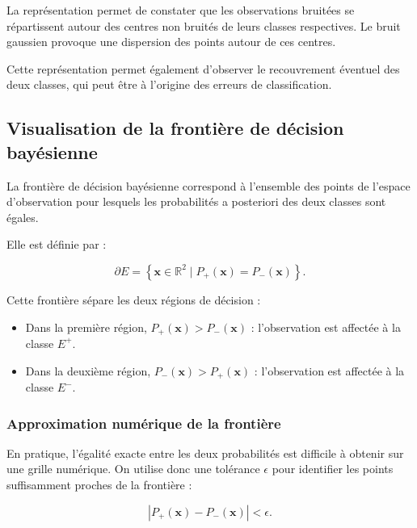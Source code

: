 La représentation permet de constater que les
observations bruitées se répartissent autour des
centres non bruités de leurs classes respectives.
Le bruit gaussien provoque une dispersion des points
autour de ces centres.

Cette représentation permet également d'observer
le recouvrement éventuel des deux classes, qui peut
être à l'origine des erreurs de classification.

\subsection{Visualisation de la frontière de décision bayésienne}

La frontière de décision bayésienne correspond à
l'ensemble des points de l'espace d'observation pour
lesquels les probabilités a posteriori des deux classes
sont égales.

Elle est définie par :

\begin{equation}
\boxed{
\partial E=
\left\{
\mathbf{x}\in\mathbb{R}^{2}
\mid P_+(\mathbf{x})=P_-(\mathbf{x})
\right\}.
}
\end{equation}

Cette frontière sépare les deux régions de décision :

\begin{itemize}
    \item Dans la première région,
    $P_+(\mathbf{x})>P_-(\mathbf{x})$ :
    l'observation est affectée à la classe $E^+$.

    \item Dans la deuxième région,
    $P_-(\mathbf{x})>P_+(\mathbf{x})$ :
    l'observation est affectée à la classe $E^-$.
\end{itemize}

\subsubsection{Approximation numérique de la frontière}

En pratique, l'égalité exacte entre les deux probabilités
est difficile à obtenir sur une grille numérique.
On utilise donc une tolérance $\epsilon$ pour identifier
les points suffisamment proches de la frontière :

\begin{equation}
\boxed{
|P_+(\mathbf{x})-P_-(\mathbf{x})|<\epsilon.
}
\end{equation}


